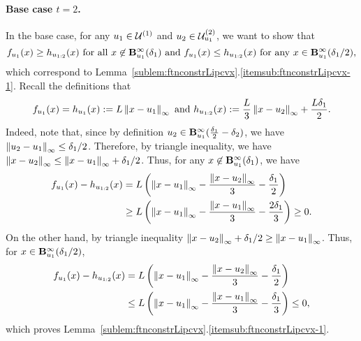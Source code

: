 \paragraph{Base case $t=2$.}
In the base case, for any $u_1 \in \mathcal{U}^{(1)}$ and $u_2 \in \mathcal{U}^{({2})}_{u_{1}}$, we want to show that 
\begin{equation*}
f_{u_1}(x) \geq h_{u_{1:{2}}}(x)~\text{for all $x\not\in \mathbf{B}^\infty_{u_{1}}({\delta_{1}})$ and }
f_{u_1}(x) \leq h_{u_{1:{2}}}(x)~\text{for any $x\in \mathbf{B}^\infty_{u_{1}}({\delta_{1}/2})$},
\end{equation*}
which correspond to Lemma~\ref{sublem:ftnconstrLipcvx}.\ref{itemsub:ftnconstrLipcvx-1}.
Recall the definitions that
\begin{equation*}
f_{u_1} (x) = h_{u_1}(x) := L\left\|{x-u_1}\right\|_\infty
\text{ and }
h_{u_{1:{2}}} (x) := \frac{L}{3} \left\|{x-u_{2}}\right\|_\infty + \frac{L \delta_1}{2}.
\end{equation*}
Indeed, note that, since by definition $u_2 \in \mathbf{B}^\infty_{u_1}({\tfrac{\delta_1}{2}-\delta_2})$, 
we have $\left\|{u_2 - u_1}\right\|_\infty \leq \delta_1/2$. Therefore, by triangle inequality, 
we have $\left\|{x-u_2}\right\|_\infty \leq \left\|{x-u_1}\right\|_\infty + \delta_1/2$. 
Thus, for any $x\not\in \mathbf{B}^\infty_{u_{1}}({\delta_{1}})$, we have 
\begin{align*}
f_{u_1}(x) - h_{u_{1:{2}}}(x) 
&= L \left(\left\|{x-u_1}\right\|_\infty - \frac{\left\|{x-u_2}\right\|_\infty}{3} - \frac{\delta_1}{2}\right) \\
&\geq L \left(\left\|{x-u_1}\right\|_\infty - \frac{\left\|{x-u_1}\right\|_\infty}{3} - \frac{2\delta_1}{3}\right) \geq 0.
\end{align*}
On the other hand, by triangle inequality $\left\|{x-u_2}\right\|_\infty +  \delta_1/2 \geq \left\|{x-u_1}\right\|_\infty$.
Thus, for $x\in \mathbf{B}^\infty_{u_{1}}({\delta_{1}/2})$, 
\begin{align*}
f_{u_1}(x) - h_{u_{1:{2}}}(x) 
&= L \left(\left\|{x-u_1}\right\|_\infty - \frac{\left\|{x-u_2}\right\|_\infty}{3} - \frac{\delta_1}{2}\right) \\
&\leq L \left(\left\|{x-u_1}\right\|_\infty - \frac{\left\|{x-u_1}\right\|_\infty}{3} - \frac{\delta_1}{3}\right) \leq 0, 
\end{align*}
which proves Lemma~\ref{sublem:ftnconstrLipcvx}.\ref{itemsub:ftnconstrLipcvx-1}. 

